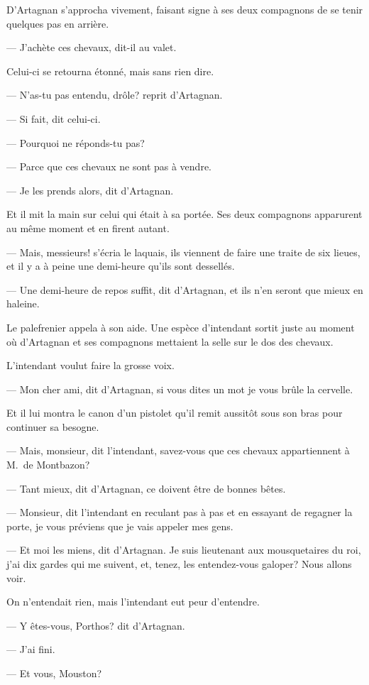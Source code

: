 D'Artagnan s'approcha vivement, faisant signe à ses deux compagnons de se tenir quelques pas en arrière.

— J'achète ces chevaux, dit-il au valet.

Celui-ci se retourna étonné, mais sans rien dire.

— N'as-tu pas entendu, drôle? reprit d'Artagnan.

— Si fait, dit celui-ci.

— Pourquoi ne réponds-tu pas?

— Parce que ces chevaux ne sont pas à vendre.

— Je les prends alors, dit d'Artagnan.

Et il mit la main sur celui qui était à sa portée. Ses deux compagnons apparurent au même moment et en firent autant.

— Mais, messieurs! s'écria le laquais, ils viennent de faire une traite de six lieues, et il y a à peine une demi-heure qu'ils sont dessellés.

— Une demi-heure de repos suffit, dit d'Artagnan, et ils n'en seront que mieux en haleine.

Le palefrenier appela à son aide. Une espèce d'intendant sortit juste au moment où d'Artagnan et ses compagnons mettaient la selle sur le dos des chevaux.

L'intendant voulut faire la grosse voix.

— Mon cher ami, dit d'Artagnan, si vous dites un mot je vous brûle la cervelle.

Et il lui montra le canon d'un pistolet qu'il remit aussitôt sous son bras pour continuer sa besogne.

— Mais, monsieur, dit l'intendant, savez-vous que ces chevaux appartiennent à M.~de Montbazon?

— Tant mieux, dit d'Artagnan, ce doivent être de bonnes bêtes.

— Monsieur, dit l'intendant en reculant pas à pas et en essayant de regagner la porte, je vous préviens que je vais appeler mes gens.

— Et moi les miens, dit d'Artagnan. Je suis lieutenant aux mousquetaires du roi, j'ai dix gardes qui me suivent, et, tenez, les entendez-vous galoper? Nous allons voir.

On n'entendait rien, mais l'intendant eut peur d'entendre.

— Y êtes-vous, Porthos? dit d'Artagnan.

— J'ai fini.

— Et vous, Mouston?


